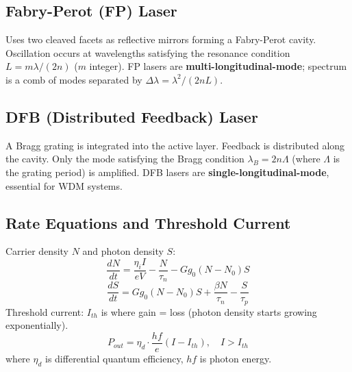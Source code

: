 \documentclass[12pt,a4paper]{article}
\begin{document}
\subsection{Fabry-Perot (FP) Laser}
Uses two cleaved facets as reflective mirrors forming a Fabry-Perot cavity. Oscillation occurs at wavelengths satisfying the resonance condition $L = m\lambda/(2n)$ ($m$ integer). FP lasers are \textbf{multi-longitudinal-mode}; spectrum is a comb of modes separated by $\Delta\lambda = \lambda^2/(2nL)$.

\subsection{DFB (Distributed Feedback) Laser}
A Bragg grating is integrated into the active layer. Feedback is distributed along the cavity. Only the mode satisfying the Bragg condition $\lambda_B = 2n\Lambda$ (where $\Lambda$ is the grating period) is amplified. DFB lasers are \textbf{single-longitudinal-mode}, essential for WDM systems.

\subsection{Rate Equations and Threshold Current}
\begin{tcolorbox}[formulabox, title={\textbf{Laser Rate Equations and L-I Characteristic}}]
Carrier density $N$ and photon density $S$:
\[
\frac{dN}{dt} = \frac{\eta_i I}{eV} - \frac{N}{\tau_n} - Gg_0(N-N_0)S
\]
\[
\frac{dS}{dt} = Gg_0(N-N_0)S + \frac{\beta N}{\tau_n} - \frac{S}{\tau_p}
\]
Threshold current: $I_{th}$ is where gain = loss (photon density starts growing exponentially).
\[
P_{out} = \eta_d \cdot \frac{hf}{e}(I - I_{th}), \quad I > I_{th}
\]
where $\eta_d$ is differential quantum efficiency, $hf$ is photon energy.
\end{tcolorbox}

\begin{tcolorbox}[tikzbox, title={L-I Curve of a Laser Diode}]
\centering
{}
\end{tcolorbox}
\end{document}

